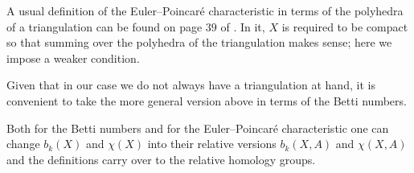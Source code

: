 \begin{nota}
    A usual definition of the Euler--Poincaré characteristic in terms of the polyhedra of a triangulation can be found on page $39$ of \cite{munoz2021}. In it, $X$ is required to be compact so that summing over the polyhedra of the triangulation makes sense; here we impose a weaker condition.

    Given that in our case we do not always have a triangulation at hand, it is convenient to take the more general version above in terms of the Betti numbers.
\end{nota}

Both for the Betti numbers and for the Euler--Poincaré characteristic one can change $b_k(X)$ and $\chi(X)$ into their relative versions $b_k(X,A)$ and $\chi(X,A)$ and the definitions carry over to the relative homology groups.

\bigskip
